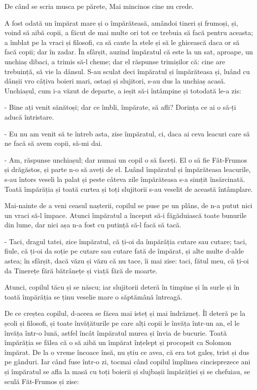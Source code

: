 \documentclass[12pt, a4paper, oneside, romanian]{teza-upb}
\begin{document}
    De când se scria musca pe părete,
    Mai mincinos cine nu crede.


A fost odată un împărat mare și o împărăteasă, amândoi tineri și
frumoși, și, voind să aibă copii, a făcut de mai multe ori tot ce
trebuia să facă pentru aceasta; a îmblat pe la vraci\cite{TanenbaumCN02} și filosofi, ca
să caute la stele și să le ghicească daca or să facă copii; dar în
zadar. În sfârșit, auzind împăratul că este la un sat, aproape, un
unchiaș dibaci, a trimis să-l cheme; dar el răspunse trimișilor că:
cine are trebuință, să vie la dânsul. S-au sculat deci împăratul și
împărăteasa și, luând cu dânșii vro câțiva boieri mari, ostași și
slujitori, s-au dus la unchiaș acasă. Unchiașul, cum i-a văzut de
departe, a ieșit să-i întâmpine și totodată le-a zis:

- Bine ați venit sănătoși; dar ce îmbli, împărate, să afli? Dorința ce
ai o să-ți aducă întristare.

- Eu nu am venit să te întreb asta, zise împăratul, ci, daca ai ceva
leacuri care să ne facă să avem copii, să-mi dai.

- Am, răspunse unchiașul; dar numai un copil o să faceți. El o să fie
Făt-Frumos și drăgăstos, și parte n-o să aveți de el. Luând împăratul
și împărăteasa leacurile, s-au întors veseli la palat și peste câteva
zile împărăteasa s-a simțit însărcinată. Toată împărăția și toată
curtea și toți slujitorii s-au veselit de această întâmplare.

Mai-nainte de a veni ceasul nașterii, copilul se puse pe un plâns, de
n-a putut nici un vraci să-l împace. Atunci împăratul a început să-i
făgăduiască toate bunurile din lume, dar nici așa n-a fost cu putință
să-l facă să tacă.

- Taci, dragul tatei, zice împăratul, că ți-oi da împărăția cutare sau
cutare; taci, fiule, că ți-oi da soție pe cutare sau cutare fată de
împărat, și alte multe d-alde astea; în sfârșit, dacă văzu și văzu că
nu tace, îi mai zise: taci, fătul meu, că ți-oi da Tinerețe fără
bătrânețe și viață fără de moarte.

Atunci, copilul tăcu și se născu; iar slujitorii deteră în timpine și
în surle și în toată împărăția se ținu veselie mare o săptămână
întreagă.

De ce creștea copilul, d-aceea se făcea mai isteț și mai îndrăzneț. Îl
deteră pe la școli și filosofi, și toate învățăturile pe care alți
copii le învăța într-un an, el le învăța într-o lună, astfel încât
împăratul murea și învia de bucurie. Toată împărăția se fălea că o să
aibă un împărat înțelept și procopsit ca Solomon împărat. De la o
vreme încoace însă, nu știu ce avea, că era tot galeș, trist și dus pe
gânduri. Iar când fuse într-o zi, tocmai când copilul împlinea
cincisprezece ani și împăratul se afla la masă cu toți boierii și
slujbașii împărăției și se chefuiau, se sculă Făt-Frumos și zise:
\end{document}
